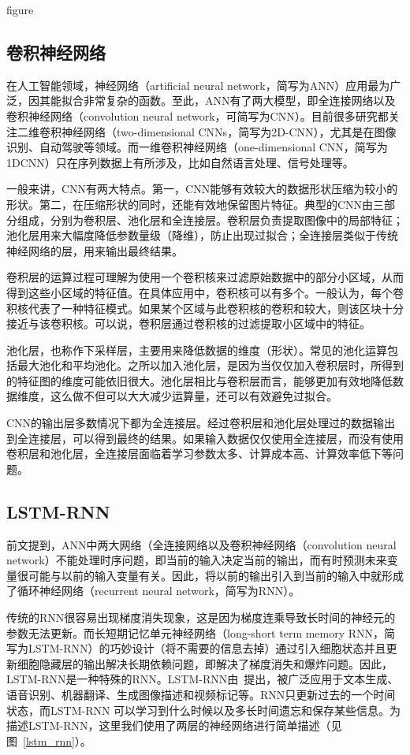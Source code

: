 figure

\subsection{卷积神经网络}\label{sec:卷积神经网络}

在人工智能领域，神经网络（artificial neural network，简写为ANN）应用最为广泛，因其能拟合非常复杂的函数。至此，ANN有了两大模型，即全连接网络以及卷积神经网络（convolution neural network，可简写为CNN）。目前很多研究都关注二维卷积神经网络（two-dimensional CNNs，简写为2D-CNN），尤其是在图像识别、自动驾驶等领域。而一维卷积神经网络（one-dimensional CNN，简写为1DCNN）只在序列数据上有所涉及，比如自然语言处理、信号处理等。

一般来讲，CNN有两大特点。第一，CNN能够有效较大的数据形状压缩为较小的形状。第二，在压缩形状的同时，还能有效地保留图片特征。典型的CNN由三部分组成，分别为卷积层、池化层和全连接层。卷积层负责提取图像中的局部特征；池化层用来大幅度降低参数量级（降维），防止出现过拟合；全连接层类似于传统神经网络的层，用来输出最终结果。

卷积层的运算过程可理解为使用一个卷积核来过滤原始数据中的部分小区域，从而得到这些小区域的特征值。在具体应用中，卷积核可以有多个。一般认为，每个卷积核代表了一种特征模式。如果某个区域与此卷积核的卷积和较大，则该区块十分接近与该卷积核。可以说，卷积层通过卷积核的过滤提取小区域中的特征。

池化层，也称作下采样层，主要用来降低数据的维度（形状）。常见的池化运算包括最大池化和平均池化。之所以加入池化层，是因为当仅仅加入卷积层时，所得到的特征图的维度可能依旧很大。池化层相比与卷积层而言，能够更加有效地降低数据维度，这么做不但可以大大减少运算量，还可以有效避免过拟合。

CNN的输出层多数情况下都为全连接层。经过卷积层和池化层处理过的数据输出到全连接层，可以得到最终的结果。如果输入数据仅仅使用全连接层，而没有使用卷积层和池化层，全连接层面临着学习参数太多、计算成本高、计算效率低下等问题。


\subsection{LSTM-RNN}\label{sec:LSTM-RNN}

前文提到，ANN中两大网络（全连接网络以及卷积神经网络（convolution neural network）不能处理时序问题，即当前的输入决定当前的输出，而有时预测未来变量很可能与以前的输入变量有关。因此，将以前的输出引入到当前的输入中就形成了循环神经网络（recurrent neural network，简写为RNN）。

传统的RNN很容易出现梯度消失现象，这是因为梯度连乘导致长时间的神经元的参数无法更新。而长短期记忆单元神经网络（long-short term memory RNN，简写为LSTM-RNN）的巧妙设计（将不需要的信息去掉）通过引入细胞状态并且更新细胞隐藏层的输出解决长期依赖问题，即解决了梯度消失和爆炸问题。因此，LSTM-RNN是一种特殊的RNN。LSTM-RNN由~\citep{hochreiter1997long}提出，被广泛应用于文本生成、语音识别、机器翻译、生成图像描述和视频标记等。RNN只更新过去的一个时间状态，而LSTM-RNN 可以学习到什么时候以及多长时间遗忘和保存某些信息。为描述LSTM-RNN，这里我们使用了两层的神经网络进行简单描述（见图~\ref{lstm_rnn}）。

